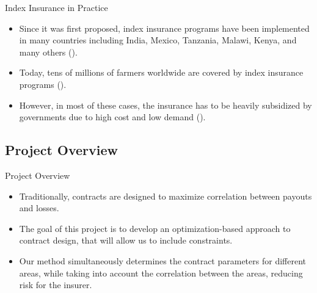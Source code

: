 \documentclass{beamer}
\begin{document}
\begin{frame}{Index Insurance in Practice}
\begin{itemize}
    \setlength\itemsep{1.5em}
    \item Since it was first proposed, index insurance programs have been implemented in many countries including India, Mexico, Tanzania, Malawi, Kenya, and many others (\cite{jensen2017agricultural}). 
    
    \item Today, tens of millions of farmers worldwide are covered by index insurance programs (\cite{greatrex2015scaling}). 
    
    \item However, in most of these cases, the insurance has to be heavily subsidized by governments due to high cost and low demand (\cite{greatrex2015scaling}). 
\end{itemize}
\end{frame}

\subsection{Project Overview}
\begin{frame}{Project Overview}
 \begin{itemize}
    \setlength\itemsep{1em}   
    \item Traditionally, contracts are designed to maximize correlation between payouts and losses. %
    \item The goal of this project is to develop an optimization-based approach to contract design, that will allow us to include constraints.
    \item Our method simultaneously determines the contract parameters for different areas, while taking into account the correlation between the areas, reducing risk for the insurer. 
 \end{itemize}
\end{frame}

\end{document}
